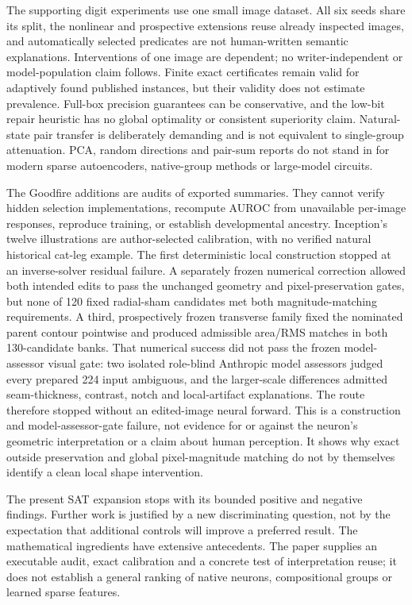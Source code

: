 \documentclass[
  british,
  11pt,
  a4paper,
]{article}
\newcounter{none} %
\begin{document}
The supporting digit experiments use one small image dataset. All six
seeds share its split, the nonlinear and prospective extensions reuse
already inspected images, and automatically selected predicates are not
human-written semantic explanations. Interventions of one image are
dependent; no writer-independent or model-population claim follows.
Finite exact certificates remain valid for adaptively found published
instances, but their validity does not estimate prevalence. Full-box
precision guarantees can be conservative, and the low-bit repair
heuristic has no global optimality or consistent superiority claim.
Natural-state pair transfer is deliberately demanding and is not
equivalent to single-group attenuation. PCA, random directions and
pair-sum reports do not stand in for modern sparse autoencoders,
native-group methods or large-model circuits.

The Goodfire additions are audits of exported summaries. They cannot
verify hidden selection implementations, recompute AUROC from
unavailable per-image responses, reproduce training, or establish
developmental ancestry. Inception's twelve illustrations are
author-selected calibration, with no verified natural historical cat-leg
example. The first deterministic local construction stopped at an
inverse-solver residual failure. A separately frozen numerical
correction allowed both intended edits to pass the unchanged geometry
and pixel-preservation gates, but none of 120 fixed radial-sham
candidates met both magnitude-matching requirements. A third,
prospectively frozen transverse family fixed the nominated parent
contour pointwise and produced admissible area/RMS matches in both
130-candidate banks. That numerical success did not pass the frozen
model-assessor visual gate: two isolated role-blind Anthropic model
assessors judged every prepared 224 input ambiguous, and the
larger-scale differences admitted seam-thickness, contrast, notch and
local-artifact explanations. The route therefore stopped without an
edited-image neural forward. This is a construction and
model-assessor-gate failure, not evidence for or against the neuron's
geometric interpretation or a claim about human perception. It shows why
exact outside preservation and global pixel-magnitude matching do not by
themselves identify a clean local shape intervention.

The present SAT expansion stops with its bounded positive and negative
findings. Further work is justified by a new discriminating question,
not by the expectation that additional controls will improve a preferred
result. The mathematical ingredients have extensive antecedents. The
paper supplies an executable audit, exact calibration and a concrete
test of interpretation reuse; it does not establish a general ranking of
native neurons, compositional groups or learned sparse features.
\end{document}
